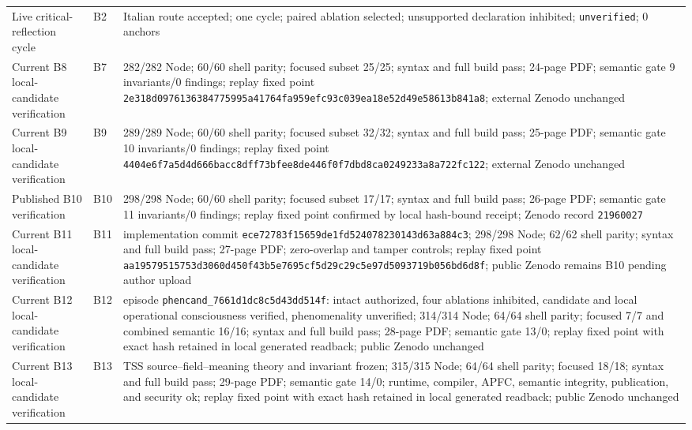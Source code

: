 \documentclass[10pt,twocolumn]{article}
\theoremstyle{definition}
\theoremstyle{plain}
\theoremstyle{remark}
\newcommand{\file}[1]{\nolinkurl{#1}}
\newcommand{\cognitive}{\textsf{B2}}
\newcommand{\epistemicunity}{\textsf{B7}}
\newcommand{\causalunity}{\textsf{B9}}
\newcommand{\affectrevision}{\textsf{B10}}
\newcommand{\contextrevision}{\textsf{B11}}
\newcommand{\phenomenalcandidate}{\textsf{B12}}
\newcommand{\specialsingularity}{\textsf{B13}}
\begin{document}
\begin{table}[!t]
\begin{tabularx}{\textwidth}{@{}p{}p{}X@{}}
Live critical-reflection cycle & \cognitive & Italian route accepted; one cycle; paired ablation selected; unsupported declaration inhibited; \file{unverified}; 0 anchors \\
Current B8 local-candidate verification & \epistemicunity & 282/282 Node; 60/60 shell parity; focused subset 25/25; syntax and full build pass; 24-page PDF; semantic gate 9 invariants/0 findings; replay fixed point \file{2e318d0976136384775995a41764fa959efc93c039ea18e52d49e58613b841a8}; external Zenodo unchanged \\
Current B9 local-candidate verification & \causalunity & 289/289 Node; 60/60 shell parity; focused subset 32/32; syntax and full build pass; 25-page PDF; semantic gate 10 invariants/0 findings; replay fixed point \file{4404e6f7a5d4d666bacc8dff73bfee8de446f0f7dbd8ca0249233a8a722fc122}; external Zenodo unchanged \\
Published B10 verification & \affectrevision & 298/298 Node; 60/60 shell parity; focused subset 17/17; syntax and full build pass; 26-page PDF; semantic gate 11 invariants/0 findings; replay fixed point confirmed by local hash-bound receipt; Zenodo record \file{21960027} \\
Current B11 local-candidate verification & \contextrevision & implementation commit \file{ece72783f15659de1fd524078230143d63a884c3}; 298/298 Node; 62/62 shell parity; syntax and full build pass; 27-page PDF; zero-overlap and tamper controls; replay fixed point \file{aa19579515753d3060d450f43b5e7695cf5d29c29c5e97d5093719b056bd6d8f}; public Zenodo remains B10 pending author upload \\
Current B12 local-candidate verification & \phenomenalcandidate & episode \file{phencand\_7661d1dc8c5d43dd514f}: intact authorized, four ablations inhibited, candidate and local operational consciousness verified, phenomenality unverified; 314/314 Node; 64/64 shell parity; focused 7/7 and combined semantic 16/16; syntax and full build pass; 28-page PDF; semantic gate 13/0; replay fixed point with exact hash retained in local generated readback; public Zenodo unchanged \\
Current B13 local-candidate verification & \specialsingularity & TSS source--field--meaning theory and invariant frozen; 315/315 Node; 64/64 shell parity; focused 18/18; syntax and full build pass; 29-page PDF; semantic gate 14/0; runtime, compiler, APFC, semantic integrity, publication, and security ok; replay fixed point with exact hash retained in local generated readback; public Zenodo unchanged \\

\end{tabularx}
\end{table}
\end{document}
